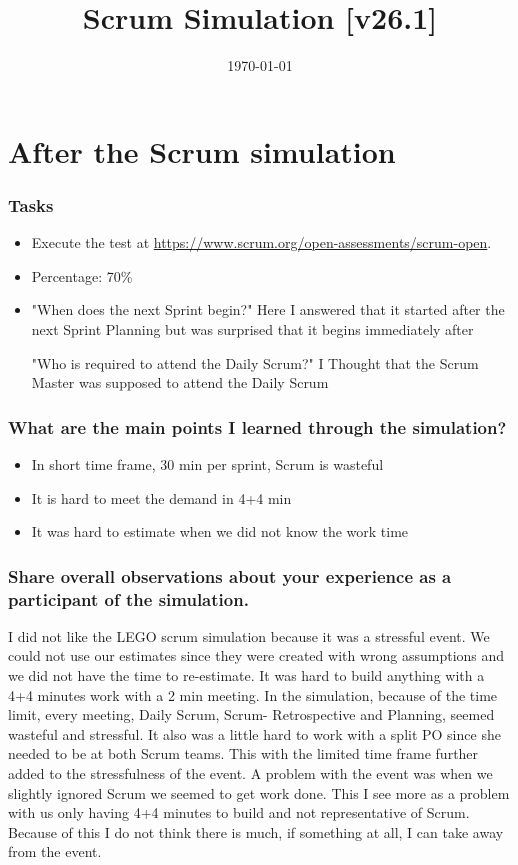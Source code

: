 \documentclass{article}
\title{Scrum Simulation %
	\normalsize{[v26.1]}}
\date{\today}
\begin{document}
\maketitle


\vfill

\newpage



\section{After the Scrum simulation}
\subsubsection*{Tasks}
\begin{itemize}
    \item Execute the test at \url{https://www.scrum.org/open-assessments/scrum-open}.
    \item Percentage: 70\% 
    \item "When does the next Sprint begin?"
        Here I answered that it started after the next Sprint Planning but was surprised that it begins immediately after

        "Who is required to attend the Daily Scrum?"
        I Thought that the Scrum Master was supposed to attend the Daily Scrum
\end{itemize}



\subsubsection*{What are the main points I learned through the simulation?}
\begin{itemize}
    \item In short time frame, 30 min per sprint, Scrum is wasteful 
    \item It is hard to meet the demand in 4+4 min 
    \item It was hard to estimate when we did not know the work time 
\end{itemize}

\subsubsection*{Share overall observations about your experience as a participant of the simulation.}

I did not like the LEGO scrum simulation because it was a stressful event. 
We could not use our estimates since they were created with wrong assumptions and we did not have the time to re-estimate.
It was hard to build anything with a 4+4 minutes work with a 2 min meeting.
In the simulation, because of the time limit, every meeting, Daily Scrum, Scrum- Retrospective and Planning, seemed wasteful and stressful.
It also was a little hard to work with a split PO since she needed to be at both Scrum teams.
This with the limited time frame further added to the stressfulness of the event.
A problem with the event was when we slightly ignored Scrum we seemed to get work done.
This I see more as a problem with us only having 4+4 minutes to build and not representative of Scrum.
Because of this I do not think there is much, if something at all, I can take away from the event.
\end{document}
